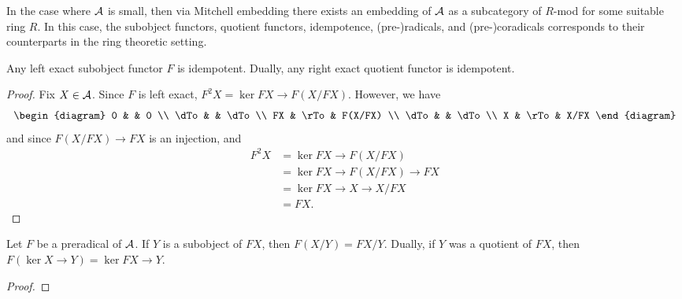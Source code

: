 \begin{rmk}
In the case where $\mathcal{A}$ is small, then via Mitchell embedding
there exists an embedding of $\mathcal{A}$ as a subcategory of $R$-mod
for some suitable ring $R$. In this case, the subobject functors, 
quotient functors, idempotence, (pre-)radicals, and (pre-)coradicals
corresponds to their counterparts in the ring theoretic setting.
\end{rmk}

\begin{prop}
Any left exact subobject functor $F$ is idempotent. Dually, any
right exact quotient functor is idempotent.
\end{prop}
\begin{proof}
Fix $X \in \mathcal{A}$. Since $F$ is left exact, $F^2X = \ker FX \to 
F(X/FX)$.
However, we have
\[
\begin{diagram}
0    &      & 0       \\
\dTo &      & \dTo    \\
FX   & \rTo & F(X/FX) \\
\dTo &      & \dTo    \\
X    & \rTo & X/FX
\end{diagram}
\]
and since $F(X/FX) \to FX$ is an injection, and
\begin{align*}
F^2X &= \ker FX \to F(X/FX) \\
     &= \ker FX \to F(X/FX) \to FX \\
     &= \ker FX \to X \to X/FX \\
     &= FX.
\end{align*}
\end{proof}

\begin{prop}
Let $F$ be a preradical of $\mathcal{A}$. If $Y$ is a subobject of $FX$,
then $F(X/Y) = FX/Y$. Dually, if $Y$ was a quotient of $FX$, then
$F(\ker X \to Y) = \ker FX \to Y$.
\end{prop}
\begin{proof}
\end{proof}
